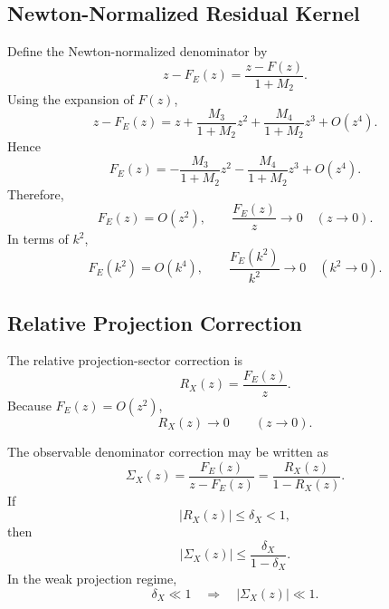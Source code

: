 \documentclass[11pt]{article}
\begin{document}
\subsection{Newton-Normalized Residual Kernel}

Define the Newton-normalized denominator by
\begin{equation}
\boxed{
z-F_E(z)
=
\frac{z-F(z)}{1+M_2}.
}
\end{equation}
Using the expansion of \(F(z)\),
\begin{equation}
z-F_E(z)
=
z
+
\frac{M_3}{1+M_2}z^2
+
\frac{M_4}{1+M_2}z^3
+
O(z^4).
\end{equation}
Hence
\begin{equation}
\boxed{
F_E(z)
=
-\frac{M_3}{1+M_2}z^2
-
\frac{M_4}{1+M_2}z^3
+
O(z^4).
}
\end{equation}
Therefore,
\begin{equation}
\boxed{
F_E(z)=O(z^2),
\qquad
\frac{F_E(z)}{z}\rightarrow0
\quad
(z\rightarrow0).
}
\end{equation}
In terms of \(k^2\),
\begin{equation}
\boxed{
F_E(k^2)=O(k^4),
\qquad
\frac{F_E(k^2)}{k^2}\rightarrow0
\quad
(k^2\rightarrow0).
}
\end{equation}

\subsection{Relative Projection Correction}

The relative projection-sector correction is
\begin{equation}
\boxed{
R_X(z)
=
\frac{F_E(z)}{z}.
}
\end{equation}
Because \(F_E(z)=O(z^2)\),
\begin{equation}
\boxed{
R_X(z)\rightarrow0
\qquad
(z\rightarrow0).
}
\end{equation}

The observable denominator correction may be written as
\begin{equation}
\boxed{
\Sigma_X(z)
=
\frac{F_E(z)}{z-F_E(z)}
=
\frac{R_X(z)}{1-R_X(z)}.
}
\end{equation}
If
\begin{equation}
\boxed{
|R_X(z)|\leq\delta_X<1,
}
\end{equation}
then
\begin{equation}
\boxed{
|\Sigma_X(z)|
\leq
\frac{\delta_X}{1-\delta_X}.
}
\end{equation}
In the weak projection regime,
\begin{equation}
\boxed{
\delta_X\ll1
\quad\Longrightarrow\quad
|\Sigma_X(z)|\ll1.
}
\end{equation}
\end{document}
